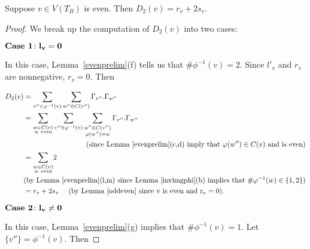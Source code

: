 \begin{lemma}\label{eventhird}
 Suppose $v \in V(T_B)$ is even. Then $D_2(v) = r_v+2s_v$.
\end{lemma}
\begin{proof}
We break up the computation of $D_2(v)$ into two cases: 

  \begin{flushleft}$\textbf{\textup{Case 1}} \colon \mathbf{l_v = 0}$ \end{flushleft}  
  In this case, Lemma~\ref{evenprelim}(f) tells us that $\# \phi^{-1}(v) = 2$. Since $l'_v$ and $r_v$ are nonnegative,  $r_v = 0$. Then
    
  \begin{align*}
  D_2(v) &= \sum_{v'' \in \phi^{-1}(v)} \sum_{w'' \in C(v'')} \Gamma_{v''}.\Gamma_{w''} \\
  &= {\sum_{\substack{w \in C(v) \\ w \ \mathrm{even}}}}  \sum_{v'' \in \phi^{-1}(v)} {\sum_{\substack{w'' \in C(v'') \\ \phi(w'') = w}} \Gamma_{v''}.\Gamma_{w''}} \\
  & \pushright{(\textup{since Lemma~\ref{evenprelim}(c,d) imply that $\phi(w'') \in C(v)$ and is even})} \\
  &= {\sum_{\substack{w \in C(v) \\ w \ \mathrm{even}}}} 2 \\
  & \pushright{(\textup{by Lemma~\ref{evenprelim}(l,m) since Lemma~\ref{invimgphi}(b) implies that}\ \# \phi^{-1}(w) \in \{1,2\} )} \\
  &= r_v + 2s_v \ \ \ \ (\mathrm{by \ Lemma~\ref{oddeven}\ since \ v \ is \ even \ and \ r_v = 0}).
  \end{align*}  

  \begin{flushleft}$\textbf{\textup{Case 2}} \colon \mathbf{l_v \neq 0}$ \end{flushleft}
  In this case, Lemma~\ref{evenprelim}(g) implies that $\# \phi^{-1}(v) = 1$. Let $\{ v'' \} = \phi^{-1}(v)$. Then
    

\end{proof}
